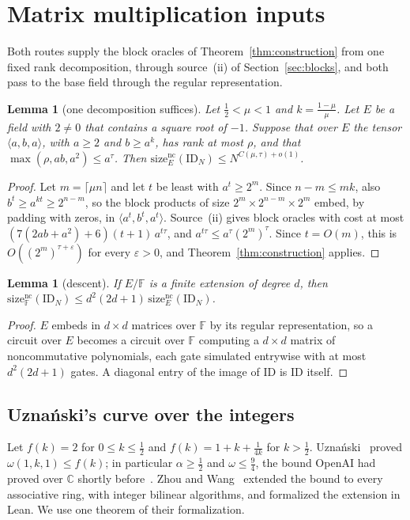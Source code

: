\documentclass[11pt]{article}
\newtheorem{lemma}[theorem]{Lemma}
\theoremstyle{definition}
\theoremstyle{remark}
\newcommand{\F}{\mathbb{F}}
\newcommand{\C}{\mathbb{C}}
\newcommand{\ID}{\mathrm{ID}}
\newcommand{\size}{\mathrm{size}^{\mathrm{nc}}}
\begin{document}
\section{Matrix multiplication inputs}\label{sec:mm}

Both routes supply the block oracles of Theorem~\ref{thm:construction} from one fixed rank decomposition, through
source~(ii) of Section~\ref{sec:blocks}, and both pass to the base field through the regular representation.

\begin{lemma}[one decomposition suffices]\label{lem:scheme}
Let $\frac12<\mu<1$ and $k=\frac{1-\mu}{\mu}$. Let $E$ be a field with $2\ne0$ that contains a square root of $-1$.
Suppose that over $E$ the tensor $\langle a,b,a\rangle$, with $a\ge2$ and $b\ge a^k$, has rank at most $\rho$,
and that $\max(\rho,ab,a^2)\le a^\tau$. Then $\size_E(\ID_N)\le N^{C(\mu,\tau)+o(1)}$.
\end{lemma}
\begin{proof}
Let $m=\lceil\mu n\rceil$ and let $t$ be least with $a^t\ge2^m$. Since $n-m\le mk$, also
$b^t\ge a^{kt}\ge2^{n-m}$, so the block products of size $2^m\times2^{n-m}\times2^m$ embed, by padding with zeros,
in $\langle a^t,b^t,a^t\rangle$. Source~(ii) gives block oracles with cost at most
$(7(2ab+a^2)+6)(t+1)\,a^{t\tau}$, and $a^{t\tau}\le a^\tau(2^m)^\tau$. Since $t=O(m)$, this is
$O((2^m)^{\tau+\varepsilon})$ for every $\varepsilon>0$, and Theorem~\ref{thm:construction} applies.
\end{proof}

\begin{lemma}[descent]\label{lem:descent}
If $E/\F$ is a finite extension of degree $d$, then $\size_\F(\ID_N)\le d^2(2d+1)\,\size_E(\ID_N)$.
\end{lemma}
\begin{proof}
$E$ embeds in $d\times d$ matrices over $\F$ by its regular representation, so a circuit over $E$ becomes a
circuit over $\F$ computing a $d\times d$ matrix of noncommutative polynomials, each gate simulated entrywise with at
most $d^2(2d+1)$ gates. A diagonal entry of the image of $\ID$ is $\ID$ itself.
\end{proof}

\subsection{Uzna\'nski's curve over the integers}\label{sec:uz}
Let $f(k)=2$ for $0\le k\le\frac12$ and $f(k)=1+k+\frac1{4k}$ for $k>\frac12$. Uzna\'nski~\cite{Uznanski2026}
proved $\omega(1,k,1)\le f(k)$; in particular $\alpha\ge\frac12$ and $\omega\le\frac94$, the bound OpenAI had proved
over $\C$ shortly before~\cite{OAI2026a}. Zhou and Wang~\cite{ZhouWang2026} extended the bound to every associative
ring, with integer bilinear algorithms, and formalized the extension in Lean. We use one theorem of their
formalization.
\end{document}
